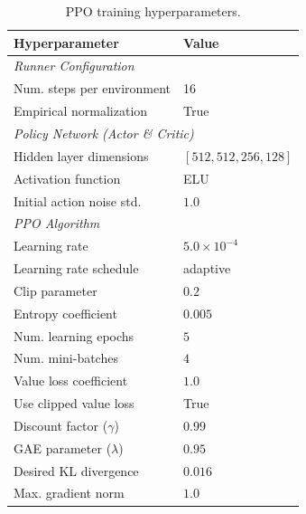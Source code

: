 \begin{table}[h]
\centering
\caption{PPO training hyperparameters.}
\label{tab:ppo_hyperparameters}
\vspace{-2mm}
\begin{tabular}{ll}
\toprule
\textbf{Hyperparameter}              & \textbf{Value}                  \\
\midrule
\multicolumn{2}{l}{\textit{Runner Configuration}} \\
\midrule
Num. steps per environment           & 16                              \\
Empirical normalization              & True                            \\
\midrule
\multicolumn{2}{l}{\textit{Policy Network (Actor \& Critic)}} \\
\midrule
Hidden layer dimensions              & $[512, 512, 256, 128]$          \\
Activation function                  & ELU                             \\
Initial action noise std.            & $1.0$                           \\
\midrule
\multicolumn{2}{l}{\textit{PPO Algorithm}} \\
\midrule
Learning rate                        & $5.0 \times 10^{-4}$            \\
Learning rate schedule               & adaptive                        \\
Clip parameter                       & $0.2$                           \\
Entropy coefficient                  & $0.005$                         \\
Num. learning epochs                 & $5$                             \\
Num. mini-batches                    & $4$                             \\
Value loss coefficient               & $1.0$                           \\
Use clipped value loss               & True                            \\
Discount factor ($\gamma$)           & $0.99$                          \\
GAE parameter ($\lambda$)            & $0.95$                          \\
Desired KL divergence                & $0.016$                         \\
Max. gradient norm                   & $1.0$                           \\
\bottomrule
\end{tabular}
\vspace{-2mm}
\end{table}

